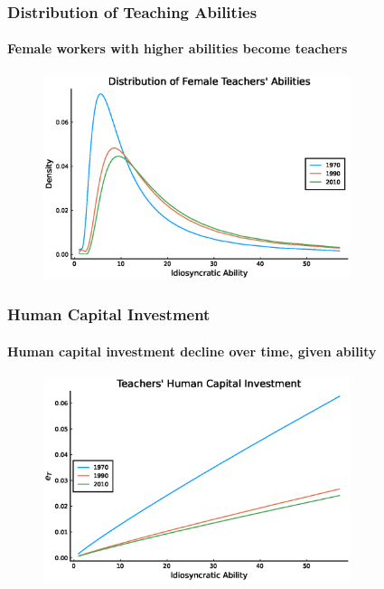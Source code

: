 \documentclass[11pt]{beamer}
\begin{document}
\begin{frame}
\frametitle{Distribution of Teaching Abilities}
\framesubtitle{Female workers with higher abilities become teachers}
\begin{figure}
 \begin{center}
\includegraphics[width=0.8\textwidth]{fT_women_steadystate_counter1.eps}
 			\label{ }
 		\end{center}
 	\end{figure}
\end{frame}


\begin{frame}
\frametitle{Human Capital Investment}
\framesubtitle{Human capital investment decline over time, given ability}
\begin{figure}
 		\begin{center}
 			\includegraphics[width=0.8\textwidth]{eT_steadystate_counter1.eps}
 			\label{ }
 		\end{center}
 	\end{figure}
\end{frame}
\end{document}
